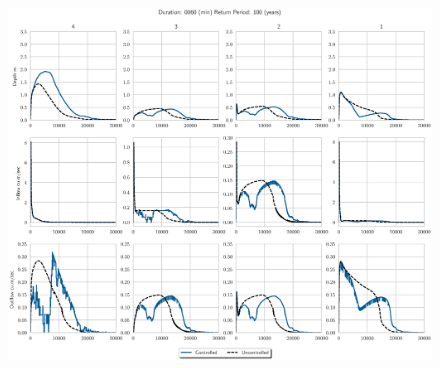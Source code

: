 \begin{figure}
    \centering
    \includegraphics[width=\linewidth]{./RL-SI-figures/77storms/0060100.eps}
\end{figure}




